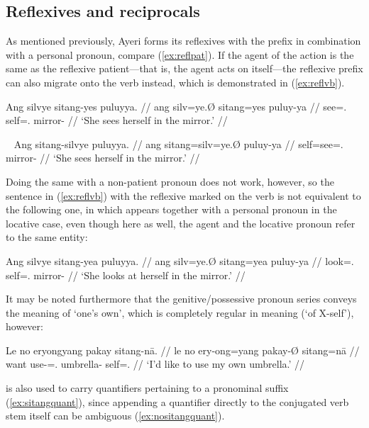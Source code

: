 
\subsection{Reflexives and reciprocals}
\label{subsec:reflrec}

As mentioned previously, Ayeri forms its reflexives with the prefix 
 in combination with a personal pronoun, compare 
(\ref{ex:reflpat}). If the agent of the action is the same as the reflexive 
patient---that is, the agent acts on itself---the reflexive prefix can also 
migrate onto the verb instead, which is demonstrated in (\ref{ex:reflvb}).

\ex\label{ex:reflpat}\begingl
	\gla Ang silvye sitang-yes puluyya. //
	\glb ang silv=ye.Ø sitang=yes puluy-ya //
	\glc \AgtT{} see=\TsgF{}.\Top{} self=\TsgF{}.\Parg{} mirror-\Loc{} //
	\glft `She sees herself in the mirror.' //
\endgl\xe

\ex~\label{ex:reflvb}\begingl
	\gla Ang sitang-silvye puluyya. //
	\glb ang sitang=silv=ye.Ø puluy-ya //
	\glc \AgtT{} self=see=\TsgF{}.\Top{} mirror-\Loc{} //
	\glft `She sees herself in the mirror.' //
\endgl\xe

Doing the same with a non-patient pronoun does not work, however, so the
sentence in (\ref{ex:reflvb}) with the reflexive  marked
on the verb is not equivalent to the following one, in which
 appears together with a personal pronoun in the locative
case, even though here as well, the agent and the locative pronoun refer to the
same entity:

\ex\label{ex:reflloc}\begingl
	\gla Ang silvye sitang-yea puluyya. //
	\glb ang silv=ye.Ø sitang=yea puluy-ya //
	\glc \AgtT{} look=\TsgF{}.\Top{} self=\TsgF{}.\Loc{} mirror-\Loc{} //
	\glft `She looks at herself in the mirror.' //
\endgl\xe

It may be noted furthermore that the genitive/possessive pronoun series conveys
the meaning of `one's own', which is completely regular in meaning (`of
X-self'), however:

\ex\begingl
	\gla Le no eryongyang pakay sitang-nā. //
	\glb le no ery-ong=yang pakay-Ø sitang=nā //
	\glc \PatTI{} want use-\Irr{}=\Fsg{}.\Aarg{} umbrella-\Top{} 
		self=\Fsg{}.\Gen{} //
	\glft `I'd like to use my own umbrella.' //
\endgl\xe

 is also used to carry quantifiers pertaining to a
pronominal suffix (\ref{ex:sitangquant}), since appending a quantifier directly
to the conjugated verb stem itself can be ambiguous (\ref{ex:nositangquant}).

